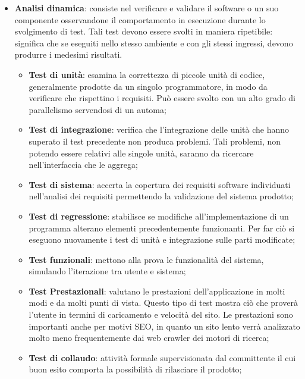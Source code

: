 {{\begin{itemize}
		\item \textbf{Analisi dinamica}: consiste nel verificare e validare il software o un suo componente osservandone il comportamento in esecuzione durante lo svolgimento di test. Tali test devono essere svolti in maniera ripetibile: significa che se eseguiti nello stesso ambiente e con gli stessi ingressi, devono produrre i medesimi risultati.
		\begin{itemize}
			\item \textbf{Test di unità}: esamina la correttezza di piccole unità di codice, generalmente prodotte da un singolo programmatore, in modo da verificare che  rispettino i requisiti. Può essere svolto con un alto grado di parallelismo servendosi di un automa;		
			\item \textbf{Test di integrazione}: verifica che l'integrazione delle unità che hanno superato il test precedente non produca problemi. Tali problemi, non potendo essere relativi alle singole unità, saranno da ricercare nell'interfaccia che le aggrega;	
			\item \textbf{Test di sistema}: accerta la copertura dei requisiti\ped{g} software individuati nell'analisi dei requisiti permettendo la validazione del sistema prodotto;
			\item \textbf{Test di regressione}: stabilisce se modifiche all'implementazione di un programma alterano elementi precedentemente funzionanti. Per far ciò si eseguono nuovamente i test di unità e integrazione sulle parti modificate;			
			\item \textbf{Test funzionali}: mettono alla prova le funzionalità del sistema, simulando l'iterazione tra utente e sistema;		
			\item \textbf{Test Prestazionali}: valutano le prestazioni dell'applicazione in molti modi e da molti punti di vista. Questo tipo di test mostra ciò che proverà l'utente in termini di caricamento e velocità del sito. Le prestazioni sono importanti anche per motivi SEO, in quanto un sito lento verrà analizzato molto meno frequentemente dai web\ped{g} crawler dei motori di ricerca;			
			\item \textbf{Test di collaudo}: attività formale supervisionata dal committente il cui buon esito comporta la possibilità di rilasciare il prodotto;
		\end{itemize}
	\end{itemize}
	}
}

